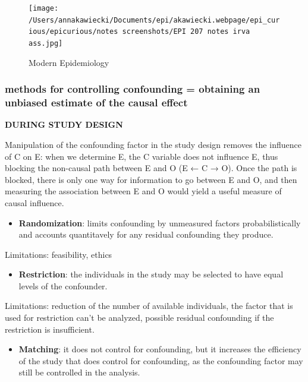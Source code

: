 \documentclass[
]{article}
\providecommand{\tightlist}{%
  \setlength{\itemsep}{0pt}\setlength{\parskip}{0pt}}
\begin{document}
\begin{figure}
\centering
\texttt{[image: /Users/annakawiecki/Documents/epi/akawiecki.webpage/epi\_curious/epicurious/notes screenshots/EPI 207 notes irva ass.jpg]}
\caption{Modern Epidemiology}
\end{figure}

\hypertarget{methods-for-controlling-confounding-obtaining-an-unbiased-estimate-of-the-causal-effect}{%
\subsubsection{methods for controlling confounding = obtaining an
unbiased estimate of the causal
effect}\label{methods-for-controlling-confounding-obtaining-an-unbiased-estimate-of-the-causal-effect}}

\textbf{DURING STUDY DESIGN}

Manipulation of the confounding factor in the study design removes the
influence of C on E: when we determine E, the C variable does not
influence E, thus blocking the non-causal path between E and O (E ← C →
O). Once the path is blocked, there is only one way for information to
go between E and O, and then measuring the association between E and O
would yield a useful measure of causal influence.

\begin{itemize}
\tightlist
\item
  \textbf{Randomization}: limits confounding by unmeasured factors
  probabilistically and accounts quantitavely for any residual
  confounding they produce.
\end{itemize}

Limitations: feasibility, ethics

\begin{itemize}
\tightlist
\item
  \textbf{Restriction}: the individuals in the study may be selected to
  have equal levels of the confounder.
\end{itemize}

Limitations: reduction of the number of available individuals, the
factor that is used for restriction can't be analyzed, possible residual
confounding if the restriction is insufficient.

\begin{itemize}
\tightlist
\item
  \textbf{Matching}: it does not control for confounding, but it
  increases the efficiency of the study that does control for
  confounding, as the confounding factor may still be controlled in the
  analysis.
\end{itemize}
\end{document}
